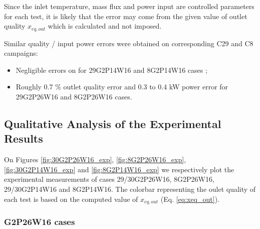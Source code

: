 \npar

Since the inlet temperature, mass flux and power input are controlled parameters for each test, it is likely that the error may come from the given value of outlet quality $x_{eq,out}$ which is calculated and not imposed.

\begin{note*}{}
Similar quality / input power errors were obtained on corresponding C29 and C8 campaigns:

\begin{itemize}
\item Negligible errors on for 29G2P14W16 and 8G2P14W16 cases ;
\item Roughly 0.7 \% outlet quality error and 0.3 to 0.4 kW power error for 29G2P26W16 and 8G2P26W16 cases. 
\end{itemize}
\end{note*}

\subsection{Qualitative Analysis of the Experimental Results}

On Figures \ref{fig:30G2P26W16_exp}, \ref{fig:8G2P26W16_exp}, \ref{fig:30G2P14W16_exp} and \ref{fig:8G2P14W16_exp} we respectively plot the experimental measurements of cases 29/30G2P26W16, 8G2P26W16, 29/30G2P14W16 and 8G2P14W16. The colorbar representing the oulet quality of each test is based on the computed value of $x_{eq,out}$ (Eq. \ref{eq:xeq_out}).


\subsubsection{G2P26W16 cases}

